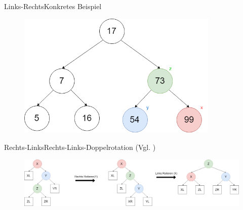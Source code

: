 \begin{frame}[allowframebreaks]{Links-Rechts}{Konkretes Beispiel}
\begin{figure}
\end{figure}
\framebreak
\begin{figure}
	\centering
	\includegraphics[height=6cm]{graph/avl_insert_lr_4}
\end{figure}

\end{frame}

\begin{frame}{Rechts-Links}{Rechts-Links-Doppelrotation (Vgl. \cite{avltree})}
\begin{figure}[ht!]
	\centering
	\includegraphics[width=\textwidth]{graph/avl_insert_rl}
\end{figure}
\end{frame}

